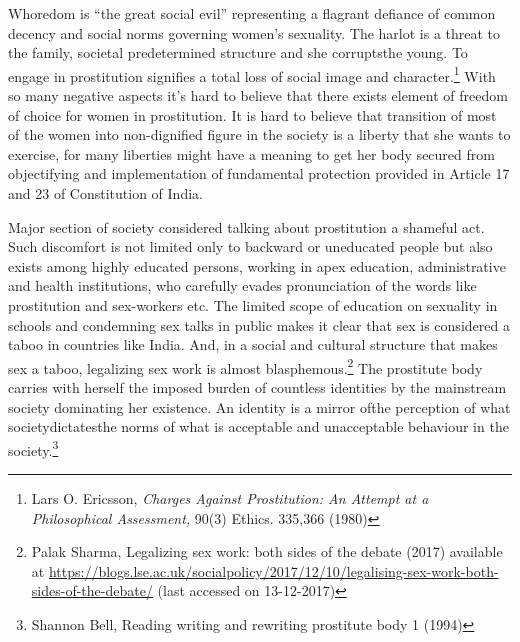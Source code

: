 \begin{multicols}{2}
\vspace{-.15cm}

\noi
Whoredom is “the great social evil” representing a flagrant defiance of common decency and
social norms governing women’s sexuality. The harlot is a threat to the family, societal predetermined structure and she corruptsthe young. To engage in prostitution signifies a total loss
of social image and character.\footnote{Lars O. Ericsson, \textit{Charges Against Prostitution: An Attempt at a Philosophical Assessment,} 90(3) Ethics. 335,366 (1980)} With so many negative aspects it’s hard to believe that there exists element of freedom of choice for women in prostitution. It is hard to believe that transition of most of the women into non-dignified figure in the society is a liberty that she
wants to exercise, for many liberties might have a meaning to get her body secured from
objectifying and implementation of fundamental protection provided in Article 17 and 23 of
Constitution of India.

\vspace{-.15cm}


\vspace{-.1cm}

\noi
Major section of society considered talking about prostitution a shameful act. Such discomfort
is not limited only to backward or uneducated people but also exists among highly educated
persons, working in apex education, administrative and health institutions, who carefully
evades pronunciation of the words like prostitution and sex-workers etc. The limited scope of
education on sexuality in schools and condemning sex talks in public makes it clear that sex is
considered a taboo in countries like India. And, in a social and cultural structure that makes sex
a taboo, legalizing sex work is almost blasphemous.\footnote{Palak Sharma, Legalizing sex work: both sides of the debate (2017) available at \url{https://blogs.lse.ac.uk/socialpolicy/2017/12/10/legalising-sex-work-both-sides-of-the-debate/} (last accessed on 13-12-2017)} The prostitute body carries with herself
the imposed burden of countless identities by the mainstream society dominating her existence.
An identity is a mirror ofthe perception of what societydictatesthe norms of what is acceptable
and unacceptable behaviour in the society.\footnote{Shannon Bell, Reading writing and rewriting prostitute body 1 (1994)}

\vspace{-.15cm}


\end{multicols}
